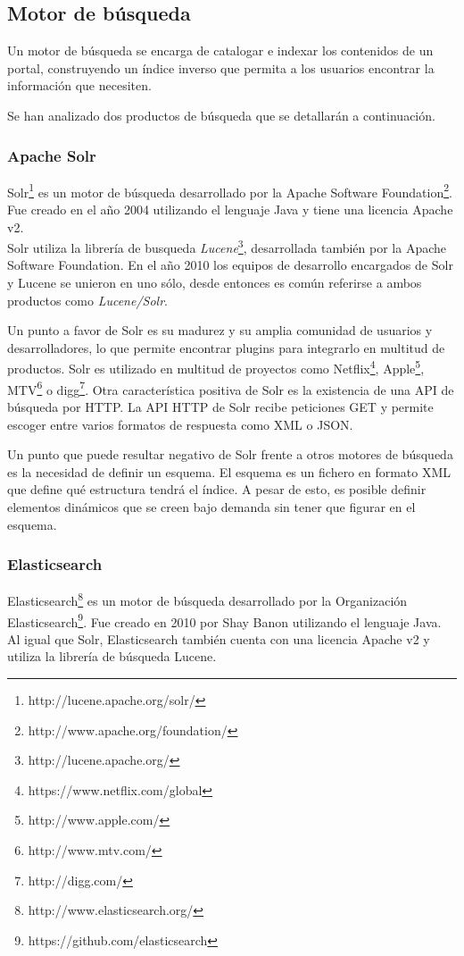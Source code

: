 \subsection{Motor de búsqueda}
Un motor de búsqueda se encarga de catalogar e indexar los contenidos de un portal, construyendo un índice inverso que permita a los usuarios encontrar la información que necesiten.

Se han analizado dos productos de búsqueda que se detallarán a continuación.


\subsubsection{Apache Solr}
Solr\footnote{http://lucene.apache.org/solr/} es un motor de búsqueda desarrollado por la Apache Software Foundation\footnote{http://www.apache.org/foundation/}.  Fue creado en el año 2004 utilizando el lenguaje Java y tiene una licencia Apache v2. \\
Solr utiliza la librería de busqueda \textit{Lucene}\footnote{http://lucene.apache.org/}, desarrollada también por la Apache Software Foundation.  En el año 2010 los equipos de desarrollo encargados de Solr y Lucene se unieron en uno sólo, desde entonces es común referirse a ambos productos como  \textit{Lucene/Solr}.

Un punto a favor de Solr es su madurez y su amplia comunidad de usuarios y desarrolladores, lo que permite encontrar plugins para integrarlo en multitud de productos. Solr es utilizado en multitud de proyectos como Netflix\footnote{https://www.netflix.com/global}, Apple\footnote{http://www.apple.com/}, MTV\footnote{http://www.mtv.com/} o digg\footnote{http://digg.com/}. \newline
Otra característica positiva de Solr es la existencia de una API de búsqueda por HTTP. La API HTTP de Solr recibe peticiones GET y permite escoger entre varios formatos de respuesta como XML o JSON.

Un punto que puede resultar negativo de Solr frente a otros motores de búsqueda es la necesidad de definir un esquema.  El esquema es un fichero en formato XML que define qué estructura tendrá el índice.  A pesar de esto, es posible definir elementos dinámicos que se creen bajo demanda sin tener que figurar en el esquema.

\subsubsection{Elasticsearch}
Elasticsearch\footnote{http://www.elasticsearch.org/} es un motor de búsqueda desarrollado por la Organización Elasticsearch\footnote{https://github.com/elasticsearch}.  Fue creado en 2010 por Shay Banon utilizando el lenguaje Java.  Al igual que Solr, Elasticsearch también cuenta con una licencia Apache v2 y utiliza la librería de búsqueda Lucene.

